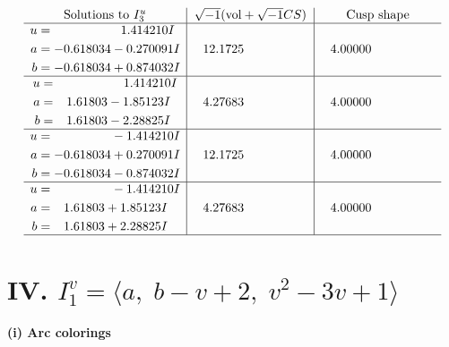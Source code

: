 \documentclass[1p]{elsarticle_modified}
\theoremstyle{definition}
\newcommand{\I}{\sqrt{-1}}
\begin{document}
$$\begin{array}{c|c|c}  
\text{Solutions to }I^u_{3}& \I (\text{vol} + \sqrt{-1}CS) & \text{Cusp shape}\\
 \hline 
\begin{aligned}
u &= \phantom{-0.000000 -}1.414210 I \\
a &= -0.618034 - 0.270091 I \\
b &= -0.618034 + 0.874032 I\end{aligned}
 & \phantom{-}12.1725\phantom{ +0.000000I} & \phantom{-}4.00000\phantom{ +0.000000I} \\ \hline\begin{aligned}
u &= \phantom{-0.000000 -}1.414210 I \\
a &= \phantom{-}1.61803 - 1.85123 I \\
b &= \phantom{-}1.61803 - 2.28825 I\end{aligned}
 & \phantom{-}4.27683\phantom{ +0.000000I} & \phantom{-}4.00000\phantom{ +0.000000I} \\ \hline\begin{aligned}
u &= \phantom{-0.000000 } -1.414210 I \\
a &= -0.618034 + 0.270091 I \\
b &= -0.618034 - 0.874032 I\end{aligned}
 & \phantom{-}12.1725\phantom{ +0.000000I} & \phantom{-}4.00000\phantom{ +0.000000I} \\ \hline\begin{aligned}
u &= \phantom{-0.000000 } -1.414210 I \\
a &= \phantom{-}1.61803 + 1.85123 I \\
b &= \phantom{-}1.61803 + 2.28825 I\end{aligned}
 & \phantom{-}4.27683\phantom{ +0.000000I} & \phantom{-}4.00000\phantom{ +0.000000I}\\
 \hline 
 \end{array}$$\newpage\newpage\renewcommand{\arraystretch}{1}
\centering \section*{IV. $I^v_{1}= \langle a,\;b- v+2,\;v^2-3 v+1 \rangle$}
\flushleft \textbf{(i) Arc colorings}\\
\end{document}
